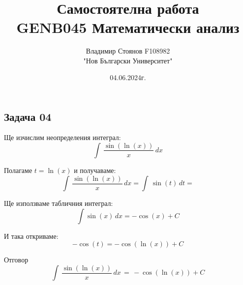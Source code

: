 \documentclass{article}
\title{\huge Самостоятелна работа \\ GENB045 Математически анализ}
\author{\LARGE Владимир Стоянов F108982 \\ \LARGE "Нов Български Университет"}
\date{\LARGE 04.06.2024г.}
\begin{document}
\maketitle

\Large
\begin{center}
    \section*{Задача 04}
\end{center}
\newpage
\begin{center}
    Ще изчислим неопределения интеграл:
    \[ \int\,\frac{\sin(\ln(x))}{x}\,dx \]
\end{center}

\vspace{1.5cm}
Полагаме $t = \ln(x)$ и получаваме:
\[ \int\,\frac{\sin(\ln(x))}{x}\,dx = \int\,\sin(t)\,dt = \]

\vspace{1cm}
Ще използваме табличния интеграл:
\[ \int \sin(x)\,dx = -\cos(x) + C \]

\vspace{1cm}
И така откриваме:
\[ -\cos(t) = -\cos(\ln(x)) + C \]

\vspace{2cm}

\begin{center}
    Отговор
    \[ \int\,\frac{\sin(\ln(x))}{x}\,dx \,=\, -\cos(\ln(x)) + C \]
\end{center}
\end{document}
